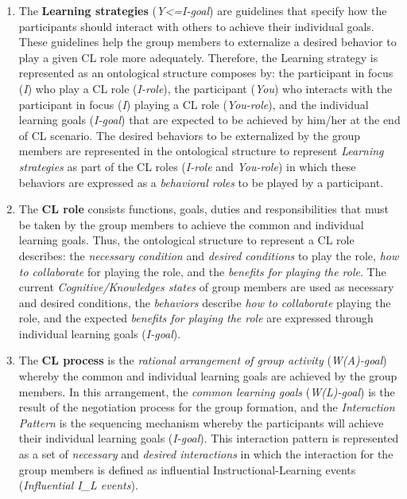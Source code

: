 \begin{enumerate} [label=(\alph*)]

\item
The \textbf{Learning strategies} (\emph{Y<=I-goal}) are guidelines that specify how the participants should interact with others to achieve their individual goals. These guidelines help the group members to externalize a desired behavior to play a given CL role more adequately. Therefore, the Learning strategy is represented as an ontological structure composes by: the participant in focus (\emph{I}) who play a CL role (\emph{I-role}), the participant (\emph{You}) who interacts with the participant in focus (\emph{I}) playing a CL role (\emph{You-role}), and the individual learning goals (\emph{I-goal}) that are expected to be achieved by him/her at the end of CL scenario. The desired behaviors to be externalized by the group members  are represented in the ontological structure to represent \emph{Learning strategies} as part of the CL roles (\emph{I-role} and \emph{You-role}) in which these behaviors are expressed as a \emph{behavioral roles} to be played by a participant.

\item
The \textbf{CL role} consists functions, goals, duties and responsibilities that must be taken by the group members to achieve the common and individual learning goals. Thus, the ontological structure to represent a CL role describes: the \emph{necessary condition} and \emph{desired conditions} to play the role, \emph{how to collaborate} for playing the role, and the \emph{benefits for playing the role}. The current \emph{Cognitive/Knowledges states} of group members are used as necessary and desired conditions, the \emph{behaviors} describe \emph{how to collaborate} playing the role, and the expected \emph{benefits for playing the role} are expressed through individual learning goals (\emph{I-goal}).

\item
The \textbf{CL process} is the \emph{rational arrangement of group activity} (\emph{W(A)-goal}) whereby the common and individual learning goals are achieved by the group members. In this arrangement, the \emph{common learning goals} (\emph{W(L)-goal}) is the result of the negotiation process for the group formation, and the \emph{Interaction Pattern} is the sequencing mechanism whereby the participants will achieve their individual learning goals (\emph{I-goal}). This interaction pattern is represented as a set of \emph{necessary} and \emph{desired interactions} in which the interaction for the group members is defined as influential Instructional-Learning events (\emph{Influential I\_L events}).


\end{enumerate}
